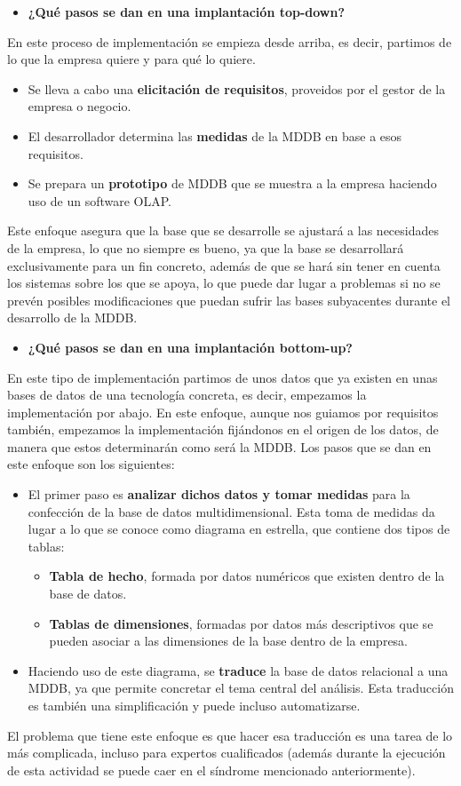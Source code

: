\documentclass[paper=a4, fontsize=11pt]{scrartcl} %
\begin{document}
\begin{itemize}
\item \textbf{ ¿Qué pasos se dan en una implantación top-down?}
\end{itemize}
En este proceso de implementación se empieza desde arriba, es decir, partimos de lo que la empresa quiere y para qué lo quiere. 
	\begin{itemize}
		\item Se lleva a cabo una \textbf{elicitación de requisitos}, proveidos por el gestor de la empresa o negocio. 
		\item El desarrollador determina las \textbf{medidas} de la MDDB en base a esos requisitos.
		\item Se prepara un \textbf{prototipo} de MDDB que se muestra a la empresa haciendo uso de un software OLAP. 
	\end{itemize}
Este enfoque asegura que la base que se desarrolle se ajustará a las necesidades de la empresa, lo que no siempre es bueno, ya que la base se desarrollará exclusivamente para un fin concreto, además de que se hará sin tener en cuenta los sistemas sobre los que se apoya, lo que puede dar lugar a problemas si no se prevén posibles modificaciones que puedan sufrir las bases subyacentes durante el desarrollo de la MDDB. 

\begin{itemize}
\item \textbf{¿Qué pasos se dan en una implantación bottom-up?}
\end{itemize}
En este tipo de implementación partimos de unos datos que ya existen en unas bases de datos de una tecnología concreta, es decir, empezamos la implementación por abajo. En este enfoque, aunque nos guiamos por requisitos también, empezamos la implementación fijándonos en el origen de los datos, de manera que estos determinarán como será la MDDB. Los pasos que se dan en este enfoque son los siguientes:
\begin{itemize}
	\item El primer paso es \textbf{analizar dichos datos y tomar medidas} para la confección de la base de datos multidimensional. Esta toma de medidas da lugar a lo que se conoce como diagrama en estrella, que contiene dos tipos de tablas:
	\begin{itemize}
	\item \textbf{Tabla de hecho}, formada por datos numéricos que existen dentro de la base de datos.
	\item \textbf{Tablas de dimensiones}, formadas por datos más descriptivos que se pueden asociar a las dimensiones de la base dentro de la empresa.
	\end{itemize}
	\item Haciendo uso de este diagrama, se \textbf{traduce} la base de datos relacional a una MDDB, ya que permite concretar el tema central del análisis. Esta traducción es también una simplificación y puede incluso automatizarse. 
\end{itemize}	
El problema que tiene este enfoque es que hacer esa traducción es una tarea de lo más complicada, incluso para expertos cualificados (además durante la ejecución de esta actividad se puede caer en el síndrome mencionado anteriormente). 
\end{document}
